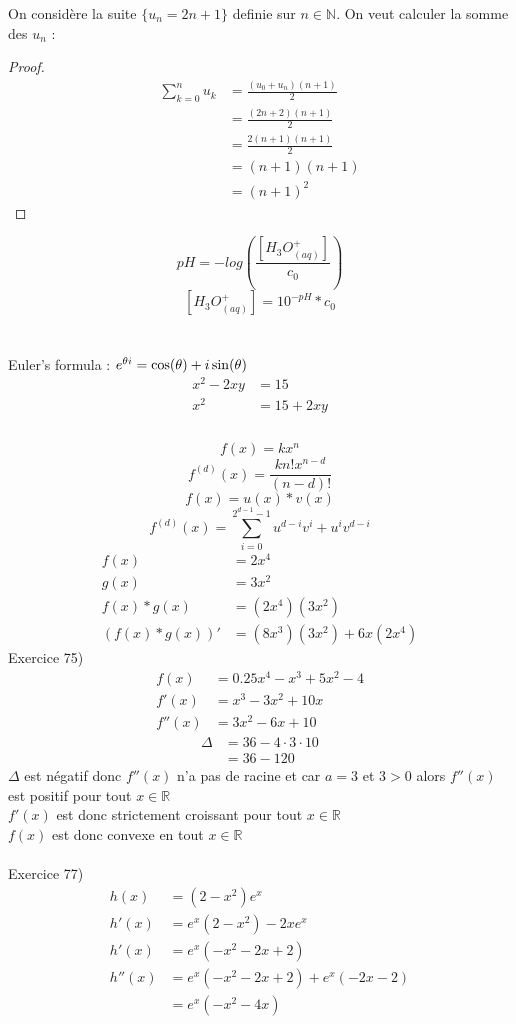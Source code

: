 \documentclass[french]{article}
\begin{document}
On considère la suite $\{u_n =2n+1\}$ definie sur $n\in\mathbb{N}$.
On veut calculer la somme des $u_n$ :
\begin{proof}
\begin{align*}
\sum_{k=0}^n u_k&=\frac{(u_0+u_n)(n+1)}{2}  \\
&=\frac{(2n+2)(n+1)}{2} \\
&=\frac{2(n+1)(n+1)}{2}  \\
&=(n+1)(n+1) \\
&=(n+1)^2
\end{align*}
\end{proof}
\[pH = -log\left(\frac{[H_3O^+_{(aq)}]}{c_0}\right)\]
\[[H_3O^+_{(aq)}]=10^{-pH}*c_0\]
\\
\\
Euler's formula : $e^{\theta\\i}=\cos(\theta)+i\sin(\theta)$ \\
\begin{align*}
x^2-2xy&=15 \\
x^2&=15+2xy \\
\end{align*}
\\
\[f(x)=kx^n\]
\[f^{(d)}(x)=\frac{kn!x^{n-d}}{(n-d)!}\]
\[f(x)=u(x)*v(x)\]
\[f^{(d)}(x)=\sum^{2^{d-1}-1}_{i=0}u^{d-i}v^i+u^iv^{d-i}\]
\begin{align*}
f(x)&=2x^4 \\
g(x)&=3x^2 \\
f(x)*g(x)&=(2x^4)(3x^2) \\
(f(x)*g(x))'&=(8x^3)(3x^2)+6x(2x^4)
\end{align*}
Exercice 75)
\begin{align*}
f(x)&=0.25x^4-x^3+5x^2-4 \\
f'(x)&=x^3-3x^2+10x \\
f''(x)&=3x^2-6x+10 
\end{align*}
\begin{align*}
\Delta&=36-4\cdot3\cdot10 \\
&=36-120
\end{align*}
$\Delta$ est négatif donc $f''(x)$ n'a pas de racine et car $a=3$ et $3>0$ alors $f''(x)$ est positif pour tout $x\in\mathbb{R}$ \\
$f'(x)$ est donc strictement croissant pour tout $x\in\mathbb{R}$ \\
$f(x)$ est donc convexe en tout $x\in\mathbb{R}$ \\
\\
Exercice 77)
\begin{align*}
h(x)&=(2-x^2)e^x \\
h'(x)&=e^x(2-x^2)-2xe^x \\
h'(x)&=e^x(-x^2-2x+2) \\
h''(x)&=e^x(-x^2-2x+2)+e^x(-2x-2) \\
&=e^x(-x^2-4x)
\end{align*}
\end{document}
